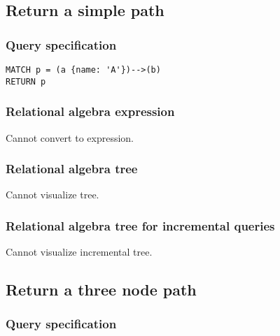 
\subsection{Return a simple path}

\subsubsection*{Query specification}

\begin{lstlisting}
MATCH p = (a {name: 'A'})-->(b)
RETURN p
\end{lstlisting}

\subsubsection*{Relational algebra expression}

Cannot convert to expression.

\subsubsection*{Relational algebra tree}

Cannot visualize tree.

\subsubsection*{Relational algebra tree for incremental queries}

Cannot visualize incremental tree.

\subsection{Return a three node path}

\subsubsection*{Query specification}


